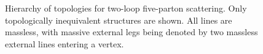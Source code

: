\begin{figure}[ht]
\begin{center}
  \end{center}
  \caption{Hierarchy of topologies for two-loop five-parton scattering.
    Only topologically inequivalent structures are shown. All lines
  are massless, with massive external legs being denoted by two massless external lines entering a vertex.}
  \label{fig:PropagatorStructures}
\end{figure}

